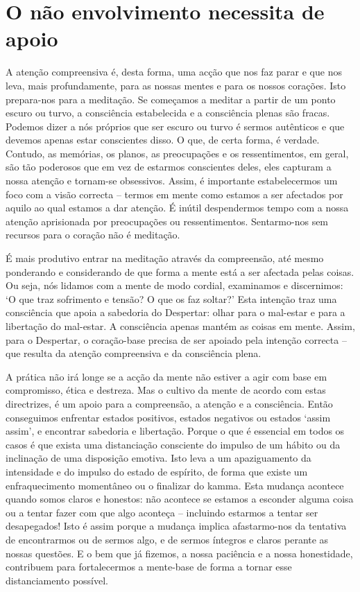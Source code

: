 \section{O não envolvimento necessita de apoio}

A atenção compreensiva é, desta forma, uma acção que nos faz parar e que nos leva, mais profundamente, para as nossas mentes e para os nossos corações. Isto prepara-nos para a meditação. Se começamos a meditar a partir de um ponto escuro ou turvo, a consciência estabelecida e a consciência plenas são fracas. Podemos dizer a nós próprios que ser escuro ou turvo é sermos autênticos e que devemos apenas estar conscientes disso. O que, de certa forma, é verdade. Contudo, as memórias, os planos, as preocupações e os ressentimentos, em geral, são tão poderosos que em vez de estarmos conscientes deles, eles capturam a nossa atenção e tornam-se obsessivos. Assim, é importante estabelecermos um foco com a visão correcta -- termos em mente como estamos a ser afectados por aquilo ao qual estamos a dar atenção. É inútil despendermos tempo com a nossa atenção aprisionada por preocupações ou ressentimentos. Sentarmo-nos sem recursos para o coração não é meditação.

É mais produtivo entrar na meditação através da compreensão, até mesmo ponderando e considerando de que forma a mente está a ser afectada pelas coisas. Ou seja, nós lidamos com a mente de modo cordial, examinamos e discernimos: `O que traz sofrimento e tensão? O que os faz soltar?' Esta intenção traz uma consciência que apoia a sabedoria do Despertar: olhar para o mal-estar e para a libertação do mal-estar. A consciência apenas mantém as coisas em mente. Assim, para o Despertar, o coração-base precisa de ser apoiado pela intenção correcta -- que resulta da atenção compreensiva e da consciência plena.

A prática não irá longe se a acção da mente não estiver a agir com base em compromisso, ética e destreza. Mas o cultivo da mente de acordo com estas directrizes, é um apoio para a compreensão, a atenção e a consciência. Então conseguimos enfrentar estados positivos, estados negativos ou estados `assim assim', e encontrar sabedoria e libertação. Porque o que é essencial em todos os casos é que exista uma distanciação consciente do impulso de um hábito ou da inclinação de uma disposição emotiva. Isto leva a um apaziguamento da intensidade e do impulso do estado de espírito, de forma que existe um enfraquecimento momentâneo ou o finalizar do kamma. Esta mudança acontece quando somos claros e honestos: não acontece se estamos a esconder alguma coisa ou a tentar fazer com que algo aconteça -- incluindo estarmos a tentar ser desapegados! Isto é assim porque a mudança implica afastarmo-nos da tentativa de encontrarmos ou de sermos algo, e de sermos íntegros e claros perante as nossas questões. E o bem que já fizemos, a nossa paciência e a nossa honestidade, contribuem para fortalecermos a mente-base de forma a tornar esse distanciamento possível.


